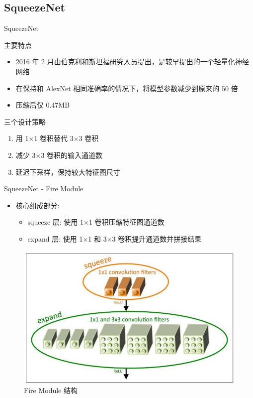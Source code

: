 \documentclass{beamer}
\begin{document}
\subsection{SqueezeNet}
\begin{frame}{SqueezeNet}
    \begin{block}{主要特点}
        \begin{itemize}
            \item 2016 年 2 月由伯克利和斯坦福研究人员提出，是较早提出的一个轻量化神经网络
            \item 在保持和 AlexNet 相同准确率的情况下，将模型参数减少到原来的 50 倍
            \item 压缩后仅 0.47MB
        \end{itemize}
    \end{block}
    \begin{block}{三个设计策略}
        \begin{enumerate}
            \item 用 1$\times$1 卷积替代 3$\times$3 卷积
            \item 减少 3$\times$3 卷积的输入通道数
            \item 延迟下采样，保持较大特征图尺寸
        \end{enumerate}
    \end{block}
\end{frame}

\begin{frame}{SqueezeNet - Fire Module}
    \begin{itemize}
        \item 核心组成部分:
        \begin{itemize}
            \item squeeze 层: 使用 1$\times$1 卷积压缩特征图通道数
            \item expand 层: 使用 1$\times$1 和 3$\times$3 卷积提升通道数并拼接结果
        \end{itemize}
    \end{itemize}
    \begin{figure}
        \centering
        \includegraphics[width=0.7\linewidth]{pic/fire_module.jpg}
        \caption{Fire Module 结构}
    \end{figure}
\end{frame}
\end{document}
